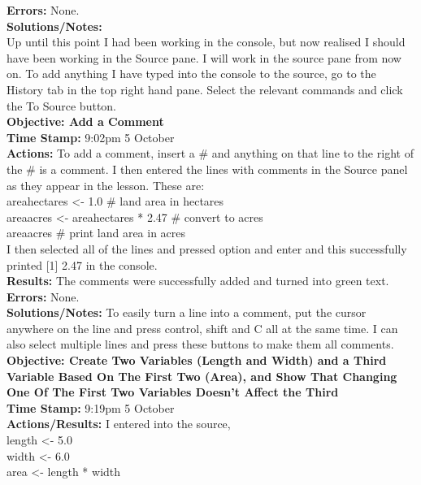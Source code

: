 \documentclass{article}
\begin{document}
\begin{FlushLeft}
\textbf{Errors:} None.\\
\textbf{Solutions/Notes:}\\
\vspace{5mm}
Up until this point I had been working in the console, but now realised I should have been working in the Source pane. I will work in the source pane from now on. To add anything I have typed into the console to the source, go to the History tab in the top right hand pane. Select the relevant commands and click the To Source button.\\ 
\vspace{5mm}
\textbf{Objective: Add a Comment}\\ 
\textbf{Time Stamp:} 9:02pm 5 October\\
\textbf{Actions:} To add a comment, insert a \# and anything on that line to the right of the \# is a comment. I then entered the lines with comments in the Source panel as they appear in the lesson. These are: \\
area\textunderscore hectares \textless - 1.0 \# land area in hectares\\
area\textunderscore acres \textless - area\textunderscore hectares * 2.47 \# convert to acres\\
area\textunderscore acres \# print land area in acres\\
I then selected all of the lines and pressed option and enter and this successfully printed [1] 2.47 in the console.\\
\textbf{Results:} The comments were successfully added and turned into green text.\\
\textbf{Errors:} None.\\
\textbf{Solutions/Notes:} To easily turn a line into a comment, put the cursor anywhere on the line and press control, shift and C all at the same time. I can also select multiple lines and press these buttons to make them all comments.\\
\vspace{5mm}
\textbf{Objective: Create Two Variables (Length and Width) and a Third Variable Based On The First Two (Area), and Show That Changing One Of The First Two Variables Doesn't Affect the Third}\\ 
\textbf{Time Stamp:} 9:19pm 5 October\\
\textbf{Actions/Results:} I entered into the source, \\
length \textless - 5.0\\
width  \textless - 6.0\\
area \textless - length * width\\

\end{FlushLeft}
\end{document}
